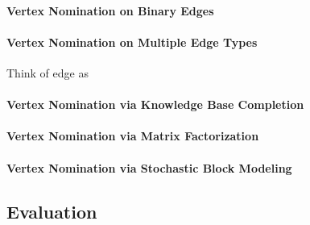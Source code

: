 \documentclass[paper=a4,fontsize=11pt]{scrartcl}
\numberwithin{equation}{section}    %
\numberwithin{figure}{section}      %
\numberwithin{table}{section}       %
\begin{document}
\paragraph{Vertex Nomination on Binary Edges}

\paragraph{Vertex Nomination on Multiple Edge Types}
Think of edge as 

\paragraph{Vertex Nomination via Knowledge Base Completion}

\paragraph{Vertex Nomination via Matrix Factorization}

\paragraph{Vertex Nomination via Stochastic Block Modeling}

\subsection{Evaluation}
\label{sec:eval-strat}




\end{document}
